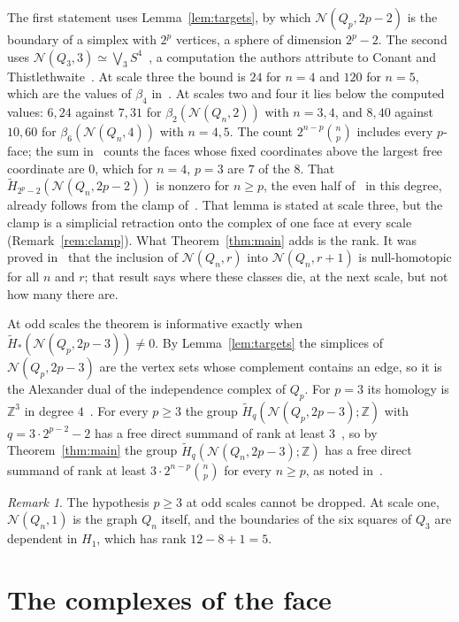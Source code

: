 \documentclass[11pt]{amsart}
\theoremstyle{remark}
\newtheorem{remark}[theorem]{Remark}
\newcommand{\N}{\mathcal{N}}
\begin{document}
The first statement uses Lemma~\ref{lem:targets}, by which $\N(Q_p,2p-2)$ is the boundary of a simplex with $2^p$
vertices, a sphere of dimension $2^p-2$. The second uses $\N(Q_3,3)\simeq\bigvee_3S^4$~\cite[Section~5]{ASS}, a
computation the authors attribute to Conant and Thistlethwaite~\cite{CT}. At scale three the bound is $24$ for $n=4$
and $120$ for $n=5$, which are the values of $\beta_4$ in~\cite[Table~1]{ASS}. At scales two and four it lies below the
computed values: $6,24$ against $7,31$ for $\beta_2(\N(Q_n,2))$ with $n=3,4$, and $8,40$ against $10,60$ for
$\beta_6(\N(Q_n,4))$ with $n=4,5$. The count $2^{n-p}\binom np$ includes every $p$-face; the sum in~\cite[Theorem~6.4]{AV}
counts the faces whose fixed coordinates above the largest free coordinate are $0$, which for $n=4$, $p=3$ are $7$ of the
$8$. That $\widetilde H_{2^p-2}(\N(Q_n,2p-2))$ is nonzero for $n\ge p$, the even half of~\cite[Question~7.2]{ASS} in this
degree, already follows from the clamp of~\cite[Lemma~5.7]{ASS}. That lemma is stated at scale three, but the clamp is a
simplicial retraction onto the complex of one face at every scale (Remark~\ref{rem:clamp}). What Theorem~\ref{thm:main}
adds is the rank. It was proved in~\cite{OneStep} that the inclusion of $\N(Q_n,r)$ into $\N(Q_n,r+1)$ is
null-homotopic for all $n$ and $r$; that result says where these classes die, at the next scale, but not how many there are.

At odd scales the theorem is informative exactly when $\widetilde H_*(\N(Q_p,2p-3))\ne0$. By Lemma~\ref{lem:targets} the
simplices of $\N(Q_p,2p-3)$ are the vertex sets whose complement contains an edge, so it is the Alexander dual of the
independence complex of $Q_p$. For $p=3$ its homology is $\mathbb Z^3$ in degree $4$~\cite{CT}. For every $p\ge3$ the
group $\widetilde H_q(\N(Q_p,2p-3);\mathbb Z)$ with $q=3\cdot2^{p-2}-2$ has a free direct summand of rank at least
$3$~\cite[Theorem~1.2]{OddScales}, so by Theorem~\ref{thm:main} the group $\widetilde H_q(\N(Q_n,2p-3);\mathbb Z)$ has a
free direct summand of rank at least $3\cdot2^{n-p}\binom np$ for every $n\ge p$, as noted in~\cite[Section~1]{OddScales}.

\begin{remark}
The hypothesis $p\ge3$ at odd scales cannot be dropped. At scale one, $\N(Q_n,1)$ is the graph $Q_n$ itself, and the
boundaries of the six squares of $Q_3$ are dependent in $H_1$, which has rank $12-8+1=5$.
\end{remark}

\section{The complexes of the face}
\end{document}
